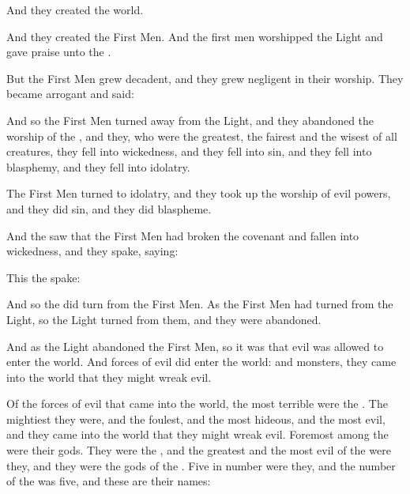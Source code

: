And they created the world. 

And they created the First Men. And the first men worshipped the Light and gave praise unto the \Sephiroth{}. 

But the First Men grew decadent, and they grew negligent in their worship. They became arrogant and said:  

And so the First Men turned away from the Light, and they abandoned the worship of the \Sephiroth{}, and they, who were the greatest, the fairest and the wisest of all creatures, they fell into wickedness, and they fell into sin, and they fell into blasphemy, and they fell into idolatry. 

The First Men turned to idolatry, and they took up the worship of evil powers, and they did sin, and they did blaspheme. 

And the \Sephiroth{} saw that the First Men had broken the covenant and fallen into wickedness, and they spake, saying: 

This the \Sephiroth{} spake: 

And so the \Sephiroth{} did turn from the First Men. As the First Men had turned from the Light, so the Light turned from them, and they were abandoned. 

And as the Light abandoned the First Men, so it was that evil was allowed to enter the world. And forces of evil did enter the world: \Daemons{} and monsters, they came into the world that they might wreak evil. 

Of the forces of evil that came into the world, the most terrible were the \dragons. The mightiest they were, and the foulest, and the most hideous, and the most evil, and they came into the world that they might wreak evil. Foremost among the \dragons{} were their gods. They were the \Dominators, and the greatest and the most evil of the \dragons{} were they, and they were the gods of the \dragons. Five in number were they, and the number of the \Dominators{} was five, and these are their names: 

